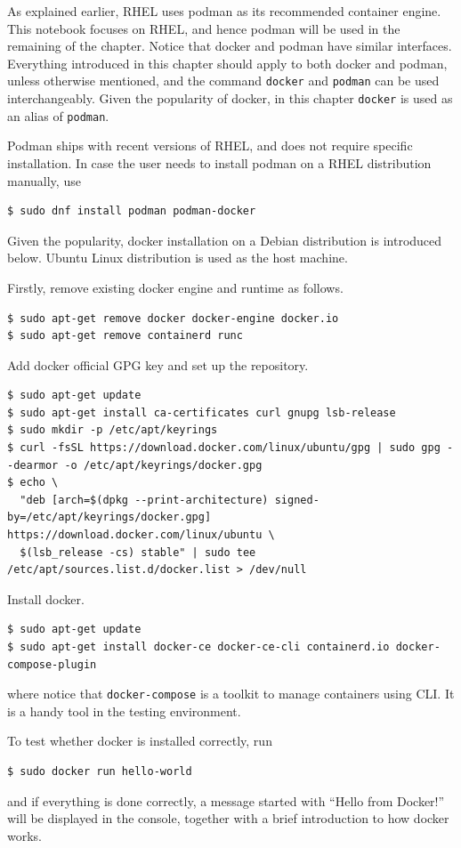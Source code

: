 As explained earlier, RHEL uses podman as its recommended container engine. This notebook focuses on RHEL, and hence podman will be used in the remaining of the chapter. Notice that docker and podman have similar interfaces. Everything introduced in this chapter should apply to both docker and podman, unless otherwise mentioned, and the command \verb|docker| and \verb|podman| can be used interchangeably. Given the popularity of docker, in this chapter \verb|docker| is used as an alias of \verb|podman|.

Podman ships with recent versions of RHEL, and does not require specific installation. In case the user needs to install podman on a RHEL distribution manually, use
\begin{lstlisting}
$ sudo dnf install podman podman-docker
\end{lstlisting}

Given the popularity, docker installation on a Debian distribution is introduced below. Ubuntu Linux distribution is used as the host machine. 

Firstly, remove existing docker engine and runtime as follows.
\begin{lstlisting}
$ sudo apt-get remove docker docker-engine docker.io
$ sudo apt-get remove containerd runc
\end{lstlisting}

Add docker official GPG key and set up the repository.
\begin{lstlisting}
$ sudo apt-get update
$ sudo apt-get install ca-certificates curl gnupg lsb-release
$ sudo mkdir -p /etc/apt/keyrings
$ curl -fsSL https://download.docker.com/linux/ubuntu/gpg | sudo gpg --dearmor -o /etc/apt/keyrings/docker.gpg
$ echo \
  "deb [arch=$(dpkg --print-architecture) signed-by=/etc/apt/keyrings/docker.gpg] https://download.docker.com/linux/ubuntu \
  $(lsb_release -cs) stable" | sudo tee /etc/apt/sources.list.d/docker.list > /dev/null
\end{lstlisting}

Install docker.
\begin{lstlisting}
$ sudo apt-get update
$ sudo apt-get install docker-ce docker-ce-cli containerd.io docker-compose-plugin
\end{lstlisting}
where notice that \verb|docker-compose| is a toolkit to manage containers using CLI. It is a handy tool in the testing environment.

To test whether docker is installed correctly, run
\begin{lstlisting}
$ sudo docker run hello-world
\end{lstlisting}
and if everything is done correctly, a message started with ``Hello from Docker!'' will be displayed in the console, together with a brief introduction to how docker works.

